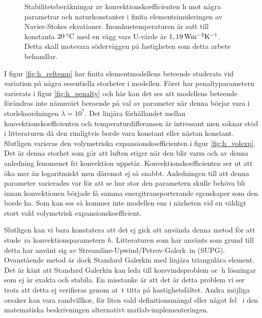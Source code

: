 \begin{figure}[hpbt]
\caption{\label{fig:konv_param}Stabilitetsberäkningar av konvektionskoefficienten h mot några
parametrar och naturkonstanter i finita elementsimuleringen av Navier-Stokes ekvationer.
Inomhustemperaturen är satt till konstanta $\unit[20]{^\circ C}$ med en vägg vars U-värde är
$\unit[1,19]{ Wm^{-2}K^{-1}}$. Detta skall motsvara söderväggen på fastigheten som detta arbete behandlar.}

\end{figure}

I figur \ref{fig:h_reftemp} har finita elementmodellens beteende studerats vid variation på några essentiella storheter i modellen.
Först har penaltyparametern varierats i figur \ref{fig:h_penalty} och här kan det ses att modellens beteende förändras inte nämnvärt
beroende på val av parameter när denna börjar vara i storleksordningen $\lambda = 10^7$. Det linjära förhållandet mellan
konvektionskoefficienten och temperaturdifferansen är intressant men saknar stöd i litteraturen då den rimligtvis borde vara
konstant eller nästan konstant. Slutligen varieras den volymetriska expansionskoefficienten
i figur \ref{fig:h_volexp}. Det är denna storhet
som gör att luften stiger när den blir varm och av denna anledning fenomenet fri konvektion uppstår. Konvektionskoefficienten
ser ut att öka mer än logaritmiskt men däremot ej så snabbt. Anledningen till att denna parameter varierades var för
att se hur stor den parametern skulle behöva bli innan konvektionen började få samma energitransporterande egenskaper
som den borde ha. Som kan ses så kommer inte modellen ens i närheten vid en väldigt stort vald volymetrisk expansionskoefficient.

Slutligen kan vi bara konstatera att det ej gick att använda denna metod för att stude\
ra konvektionsparametern $h$. Litteraturen
som har använts som grund till detta har använt sig av Streamline-Upwind/Petrov-Galerk\
in (SUPG). \cite{heinrich88}\cite{roy05} Ovanstående metod är dock
Standard Galerkin med linjära triangulära element. Det är känt att Standard Galerkin kan leda till korsvindsproblem oc\
h lösningar som ej är
exakta och stabila.\cite{segal2011}
En misstanke är att det är detta problem vi ser trots att detta ej verifieras genom at\
t titta på hastighetsfältet. Andra
möjliga orsaker kan vara randvillkor, för liten vald definitionsmängd eller något fel \
i den matematiska beskrivningen alternativt
matlab-implementeringen.
